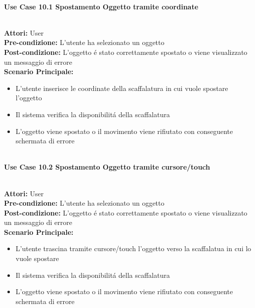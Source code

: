 \Large\textbf{}\\
\Large\textbf{Use Case 10.1 Spostamento Oggetto tramite coordinate} \\

\vspace{0.5cm}

\large\textbf{} \\
\textbf{Attori:} User\\
\textbf{Pre-condizione:} L'utente ha selezionato un oggetto \\
\textbf{Post-condizione: } L'oggetto é stato correttamente spostato o viene visualizzato un messaggio di errore\\
\textbf{Scenario Principale:} 
\begin{itemize}
    \item L'utente inserisce le coordinate della scaffalatura in cui vuole spostare l'oggetto
    \item Il sistema verifica la disponibilitá della scaffalatura
    \item L'oggetto viene spostato o il movimento viene rifiutato con conseguente schermata di errore
\end{itemize}

\vspace{0.5cm}

\Large\textbf{}\\
\Large\textbf{Use Case 10.2 Spostamento Oggetto tramite cursore/touch} \\

\vspace{0.5cm}

\large\textbf{} \\
\textbf{Attori:} User\\
\textbf{Pre-condizione:} L'utente ha selezionato un oggetto \\
\textbf{Post-condizione: } L'oggetto é stato correttamente spostato o viene visualizzato un messaggio di errore\\
\textbf{Scenario Principale:} 
\begin{itemize}
    \item L'utente trascina tramite cursore/touch l'oggetto verso la scaffalatua in cui lo vuole spostare
    \item Il sistema verifica la disponibilitá della scaffalatura
    \item L'oggetto viene spostato o il movimento viene rifiutato con conseguente schermata di errore
\end{itemize}

